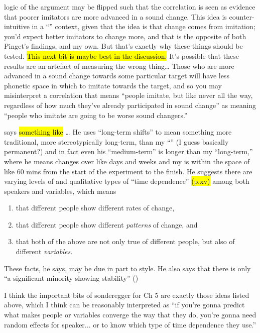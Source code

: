     logic of the argument may be flipped such that the correlation is seen as evidence that poorer imitators are more advanced in a sound change. This idea is counter-intuitive in a ``\cbat{}'' context, given that the idea is that change comes from imitation; you'd expect better imitators to change more, and that is the opposite of both Pinget's findings, and my own. But that's exactly why these things should be tested. \hl{This next bit is maybe best in the discussion.} It's possible that these results are an artefact of measuring the wrong thing\ldots{} Those who are more advanced in a sound change towards some particular target will have less phonetic space in which to imitate towards the target, and so you may misinterpret a correlation that means ``people imitate, but like never all the way, regardless of how much they've already participated in sound change'' as meaning ``people who imitate are going to be worse sound changers.''

\cite{sonderegger2012phonetic} says \hl{something like} \ldots{} He uses ``long-term shifts'' to mean something more traditional, more stereotypically long-term, than my ``\lta{}'' (I guess basically permanent?) and in fact even his ``medium-term'' is longer than my ``long-term,'' where he means changes over like days and weeks and my is within the space of like 60 mins from the start of the experiment to the finish. He suggests there are varying levels of and qualitative types of ``time dependence'' \hl{(p.xv)} among both speakers and variables, which means
\begin{enumerate}
    \item that different people show different rates of change,
    \item that different people show different \emph{patterns} of change, and
    \item that both of the above are not only true of different people, but also of different \emph{variables}.
\end{enumerate}
These facts, he says, may be due in part to style. He also says that there is only ``a significant minority showing stability'' (\citeyearpar[p.xv-xvi]{sonderegger2012phonetic})

I think the important bits of sonderegger for Ch 5 are exactly those ideas listed above, which I think can be reasonably interpreted as ``if you're gonna predict what makes people or variables converge the way that they do, you're gonna need random effects for speaker... or to know which type of time dependence they use.''

